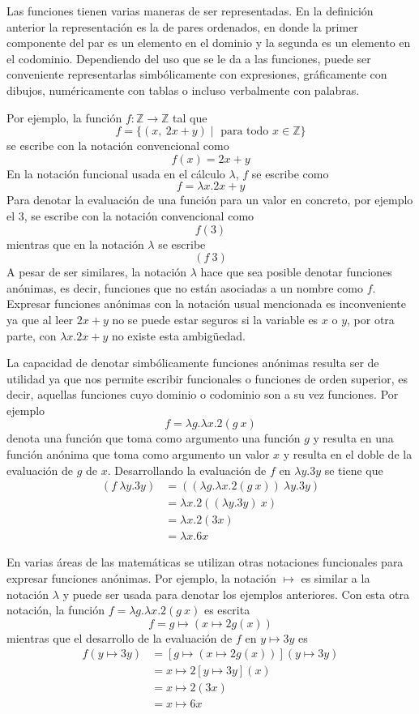 Las funciones tienen varias maneras de ser representadas. En la definición anterior la representación es la de pares ordenados, en donde la primer componente del par es un elemento en el dominio y la segunda es un elemento en el codominio. Dependiendo del uso que se le da a las funciones, puede ser conveniente representarlas simbólicamente con expresiones, gráficamente con dibujos, numéricamente con tablas o incluso verbalmente con palabras.

Por ejemplo, la función $ f : \mathbb{Z} \to \mathbb{Z} $ tal que
\[ f = \{ (x,\ 2x+y) \mid \text{ para todo } x\in\mathbb{Z} \} \]
se escribe con la notación convencional como
\[ f(x) = 2x+y \]
En la notación funcional usada en el cálculo $ λ $, $ f $ se escribe como
\[ f = λx.2x+y \]
Para denotar la evaluación de una función para un valor en concreto, por ejemplo el $ 3 $, se escribe con la notación convencional como
\[ f(3) \]
mientras que en la notación $ λ $ se escribe
\[ (f\ 3) \]
A pesar de ser similares, la notación $ λ $ hace que sea posible denotar funciones anónimas, es decir, funciones que no están asociadas a un nombre como $ f $. Expresar funciones anónimas con la notación usual mencionada es inconveniente ya que al leer $ 2x+y $ no se puede estar seguros si la variable es $ x $ o $ y $, por otra parte, con $ λx.2x+y $ no existe esta ambigüedad.

La capacidad de denotar simbólicamente funciones anónimas resulta ser de utilidad ya que nos permite escribir funcionales o funciones de orden superior, es decir, aquellas funciones cuyo dominio o codominio son a su vez funciones. Por ejemplo
\[ f = λg.λx.2(g\ x) \]
denota una función que toma como argumento una función $ g $ y resulta en una función anónima que toma como argumento un valor $ x $ y resulta en el doble de la evaluación de $ g $ de $ x $. Desarrollando la evaluación de $ f $ en $ λy.3y $ se tiene que
\begin{align*}
(f\ λy.3y) 	&= ((λg.λx.2(g\ x))\ λy.3y) \\
			&= λx.2((λy.3y)\ x) \\
            &= λx.2(3x) \\
            &= λx.6x
\end{align*}

En varias áreas de las matemáticas se utilizan otras notaciones funcionales para expresar funciones anónimas. Por ejemplo, la notación $ \mapsto $ es similar a la notación $ λ $ y puede ser usada para denotar los ejemplos anteriores. Con esta otra notación, la función $ f = λg.λx.2(g\ x) $ es escrita
\[ f = g \mapsto (x \mapsto 2g(x)) \]
mientras que el desarrollo de la evaluación de $ f $ en $ y \mapsto 3y $ es
\begin{align*}
f(y \mapsto 3y) 	&= [g \mapsto (x \mapsto 2g(x))](y \mapsto 3y) \\
					&= x \mapsto 2[y \mapsto 3y](x) \\
            		&= x \mapsto 2(3x) \\
            		&= x \mapsto 6x
\end{align*}

